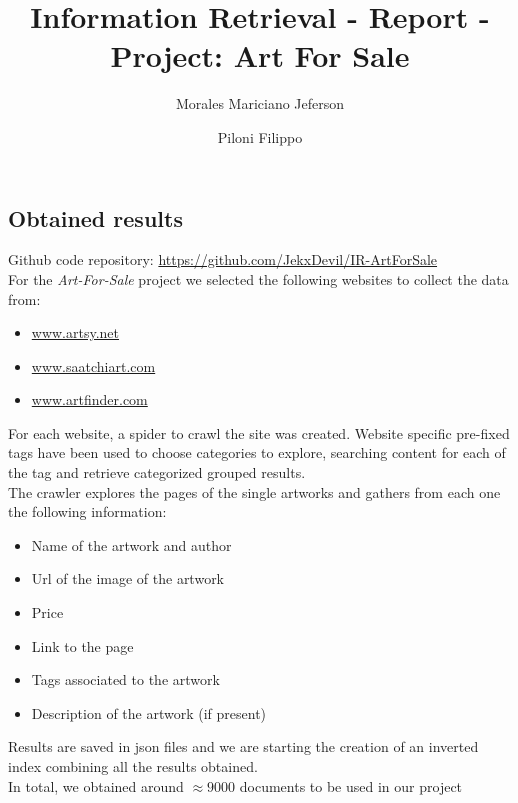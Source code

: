 \documentclass[12pt]{spieman}  %
\title{Information Retrieval - Report - Project: Art For Sale}
\author{Morales Mariciano Jeferson}
\author{Piloni Filippo}
\affil{Universita' della Svizzera italiana, Faculty of Informatics, Lugano, Switzerland}
\begin{document}
\maketitle

\begin{spacing}{1}   %

    \section{Obtained results}
    Github code repository: \url{https://github.com/JekxDevil/IR-ArtForSale}\\
    For the \textit{Art-For-Sale} project we selected the following websites to collect the data from:
    \begin{itemize}
        \setlength\itemsep{0.3em}
        \item [1.] \url{www.artsy.net}
        \item [2.] \url{www.saatchiart.com}
        \item [3.] \url{www.artfinder.com}
    \end{itemize}
    For each website, a spider to crawl the site was created.
    Website specific pre-fixed tags have been used to choose categories to explore,
    searching content for each of the tag and retrieve categorized grouped results. \\
    The crawler explores the pages of the single artworks and gathers from each one the following information:
    \begin{itemize}
        \setlength\itemsep{0.3em}
        \item Name of the artwork and author
        \item Url of the image of the artwork
        \item Price
        \item Link to the page
        \item Tags associated to the artwork
        \item Description of the artwork (if present)
    \end{itemize}
    Results are saved in json files and we are starting the creation of an inverted index combining all the results obtained.\\
    In total, we obtained around $\approx9000$ documents to be used in our project\\

\end{spacing}
\end{document}
